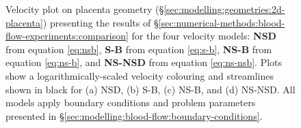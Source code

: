 \begin{figure}
\begin{subfigure}[b]{\textwidth}
\begin{subfigure}[b]{\textwidth}
                    \caption{}
                    \label{fig:4-models-placenta:ns-nsb}
                \end{subfigure}
                \end{subfigure}
                \caption{Velocity plot on placenta geometry (\S\ref{sec:modelling:geometries:2d-placenta}) presenting the results of \S\ref{sec:numerical-methods:blood-flow-experiments:comparison} for the four velocity models: \textbf{NSD} from equation \eqref{eq:nsb}, \textbf{S-B} from equation \eqref{eq:s-b}, \textbf{NS-B} from equation \eqref{eq:ns-b}, and \textbf{NS-NSD} from equation \eqref{eq:ns-nsb}. Plots show a logarithmically-scaled velocity colouring and streamlines shown in black for (a) NSD, (b) S-B, (c) NS-B, and (d) NS-NSD. All models apply boundary conditions and problem parameters presented in \S\ref{sec:modelling:blood-flow:boundary-conditions}.}
                \label{fig:4-models-placenta}
            \end{figure}
    
